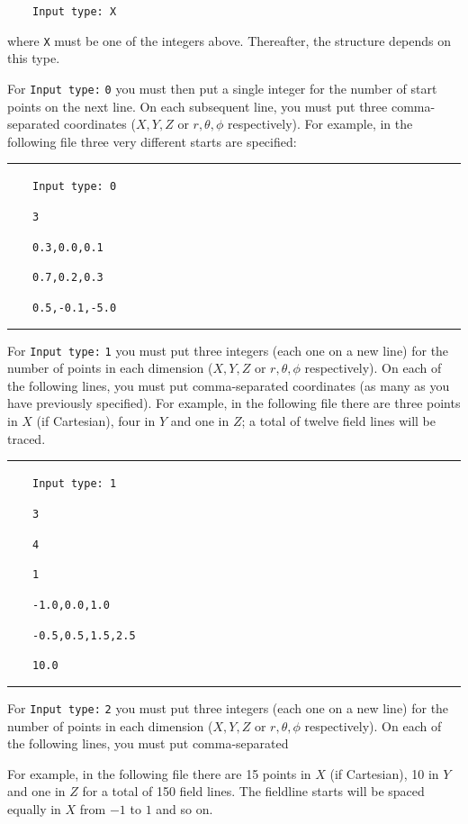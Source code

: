 \documentclass[12pt,twoside]{article}
\begin{document}
$\quad\quad$\texttt{Input type: X}

where \texttt{X} must be one of the integers above. Thereafter, the structure depends on this type.

For \texttt{Input type:} \texttt{0} you must then put a single integer for the number of start points on the next line. On each subsequent line, you must put three comma-separated coordinates ($X,Y,Z$ or $r,\theta,\phi$ respectively). For example, in the following file three very different starts are specified:

\noindent\rule{\linewidth}{0.4pt}

$\quad\quad$\texttt{Input type: 0}

$\quad\quad$\texttt{3}

$\quad\quad$\texttt{0.3,0.0,0.1}

$\quad\quad$\texttt{0.7,0.2,0.3}

$\quad\quad$\texttt{0.5,-0.1,-5.0}

\noindent\rule{\linewidth}{0.4pt}

\vspace{2mm}

For \texttt{Input type:} \texttt{1} you must put three integers (each one on a new line) for the number of points in each dimension ($X,Y,Z$ or $r,\theta,\phi$ respectively). On each of the following lines, you must put comma-separated coordinates (as many as you have previously specified). For example, in the following file there are three points in $X$ (if Cartesian), four in $Y$ and one in $Z$; a total of twelve field lines will be traced.

\noindent\rule{\linewidth}{0.4pt}

$\quad\quad$\texttt{Input type: 1}

$\quad\quad$\texttt{3}

$\quad\quad$\texttt{4}

$\quad\quad$\texttt{1}

$\quad\quad$\texttt{-1.0,0.0,1.0}

$\quad\quad$\texttt{-0.5,0.5,1.5,2.5}

$\quad\quad$\texttt{10.0}

\noindent\rule{\linewidth}{0.4pt}

For \texttt{Input type:} \texttt{2} you must put three integers (each one on a new line) for the number of points in each dimension ($X,Y,Z$ or $r,\theta,\phi$ respectively). On each of the following lines, you must put comma-separated 

For example, in the following file there are 15 points in $X$ (if Cartesian), 10 in $Y$ and one in $Z$ for a total of 150 field lines. The fieldline starts will be spaced equally in $X$ from $-1$ to $1$ and so on.
\end{document}
